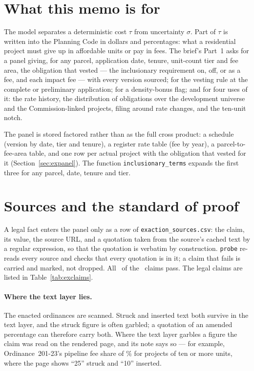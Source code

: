 \documentclass[11pt]{article}
\begin{document}
\clearpage
\tableofcontents
\clearpage

\section{What this memo is for}\label{sec:exintro}

The model separates a deterministic cost $\tau$ from uncertainty $\sigma$. Part of $\tau$ is
written into the Planning Code in dollars and percentages: what a residential project must give
up in affordable units or pay in fees. The brief's Part~1 asks for a panel giving, for any
parcel, application date, tenure, unit-count tier and fee area, the obligation that vested ---
the inclusionary requirement on, off, or as a fee, and each impact fee --- with every version
sourced; for the vesting rule at the complete or preliminary application; for a density-bonus
flag; and for four uses of it: the rate history, the distribution of obligations over the
development universe and the Commission-linked projects, filing around rate changes, and the
ten-unit notch.

The panel is stored factored rather than as the full cross product: a schedule (version by date,
tier and tenure), a register rate table (fee by year), a parcel-to-fee-area table, and one row
per actual project with the obligation that vested for it (Section~\ref{sec:expanel}). The
function \texttt{inclusionary\_terms} expands the first three for any parcel, date, tenure and
tier.

\section{Sources and the standard of proof}\label{sec:exsources}

A legal fact enters the panel only as a row of \texttt{exaction\_sources.csv}: the claim, its
value, the source URL, and a quotation taken from the source's cached text by a regular
expression, so that the quotation is verbatim by construction. \texttt{probe} re-reads every
source and checks that every quotation is in it; a claim that fails is carried and marked, not
dropped. All \exClaimsVerified\ of the \exClaims\ claims pass. The legal claims are listed in
Table~\ref{tab:exclaims}.

\paragraph{Where the text layer lies.} The enacted ordinances are scanned. Struck and inserted
text both survive in the text layer, and the struck figure is often garbled; a quotation of an
amended percentage can therefore carry both. Where the text layer garbles a figure the claim was
read on the rendered page, and its note says so --- for example, Ordinance~201-23's pipeline fee
share of \% for projects of ten or more units, where the page shows ``25''
struck and ``10'' inserted.
\end{document}

